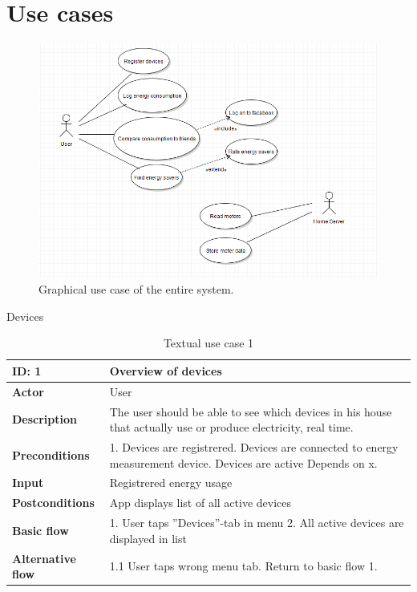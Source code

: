 \chapter{Use cases}
\begin{figure}[H]
\includegraphics[width=\textwidth]{ch/specification/fig/usecase.png}
\caption{Graphical use case of the entire system.}
\label{fig:usecase}
\end{figure}

Devices

\begin{table}[H]
\begin{tabular}{|l|p{11.7cm}|}
\hline
\textbf{ID:} 1&\textbf{Overview of devices}\\\hline
\textbf{Actor} &User\\\hline
\textbf{Description}&
The user should be able to see which devices in his house that actually use or produce electricity, real time.\\\hline
\textbf{Preconditions}&
1. Devices are registrered\newline
2. Devices are connected to energy measurement device\newline
3. Devices are active\newline
Depends on x.\\\hline
\textbf{Input}&
Registrered energy usage\\\hline
\textbf{Postconditions}& App displays list of all active devices\\\hline
\textbf{Basic flow}&
1. User taps ''Devices''-tab in menu
2. All active devices are displayed in list\\\hline
\textbf{Alternative flow}&
1.1 User taps wrong menu tab. Return to basic flow 1.\\\hline
\end{tabular}
\caption{Textual use case 1}
\end{table}


